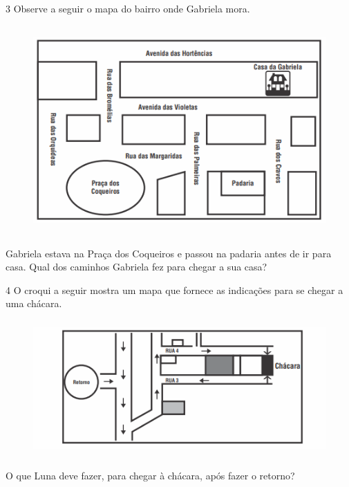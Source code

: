 {{{{

\num{3}  Observe a seguir o mapa do bairro onde Gabriela mora.

\begin{figure}[H]
\centering\includegraphics[width=4.95347in,height=3.13958in]{./imgSAEB_6_MAT/media/image66.png}
\end{figure}

Gabriela estava na Praça dos Coqueiros e passou na padaria antes de ir
para casa. Qual dos caminhos Gabriela fez para chegar a sua casa?


\num{4}  O croqui a seguir mostra um mapa que fornece as indicações para se
chegar a uma chácara.

\begin{figure}[H]
\centering\includegraphics[width=4.95347in,height=2.04653in]{./imgSAEB_6_MAT/media/image67.png}
\end{figure}

O que Luna deve fazer, para chegar à chácara, após fazer o retorno?


}}}}
